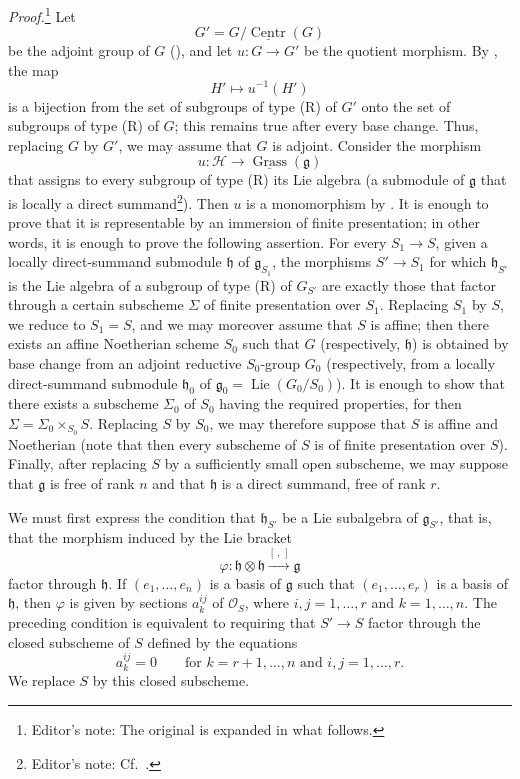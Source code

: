 \textit{Proof.}\footnote{Editor's note: The original is expanded in
what follows.}
Let
\[
  G'=G/\underline{\operatorname{Centr}}(G)
\]
be the adjoint group of \(G\) \textup{()}, and let
\(u\colon G\to G'\) be the quotient morphism. By ,
the map
\[
  H'\longmapsto u^{-1}(H')
\]
is a bijection from the set of subgroups of type \textup{(R)} of
\(G'\) onto the set of subgroups of type \textup{(R)} of \(G\);
this remains true after every base change. Thus, replacing \(G\)
by \(G'\), we may assume that \(G\) is adjoint. Consider the
morphism
\[
  u\colon
  \mathcal H
  \longrightarrow
  \underline{\operatorname{Grass}}(\mathfrak g)
\]
that assigns to every subgroup of type \textup{(R)} its Lie algebra
\textup{(a submodule of \(\mathfrak g\) that is locally a direct
summand\footnote{Editor's note: Cf.\ .})}.
Then \(u\) is a monomorphism by . It is enough to prove that
it is representable by an immersion of finite presentation; in
other words, it is enough to prove the following assertion. For
every \(S_1\to S\), given a locally direct-summand submodule
\(\mathfrak h\) of \(\mathfrak g_{S_1}\), the morphisms
\(S'\to S_1\) for which \(\mathfrak h_{S'}\) is the Lie algebra of
a subgroup of type \textup{(R)} of \(G_{S'}\) are exactly those
that factor through a certain subscheme \(\Sigma\) of finite
presentation over \(S_1\). Replacing \(S_1\) by \(S\), we reduce
to \(S_1=S\), and we may moreover assume that \(S\) is affine;
then there exists an affine Noetherian scheme \(S_0\) such that
\(G\) \textup{(respectively, \(\mathfrak h\))} is obtained by base
change from an adjoint reductive \(S_0\)-group \(G_0\)
\textup{(respectively, from a locally direct-summand submodule
\(\mathfrak h_0\) of
\(\mathfrak g_0=\operatorname{Lie}(G_0/S_0)\))}. It is enough to
show that there exists a subscheme \(\Sigma_0\) of \(S_0\) having
the required properties, for then
\(\Sigma=\Sigma_0\times_{S_0}S\). Replacing \(S\) by \(S_0\), we
may therefore suppose that \(S\) is affine and Noetherian
\textup{(note that then every subscheme of \(S\) is of finite
presentation over \(S\))}. Finally, after replacing \(S\) by a
sufficiently small open subscheme, we may suppose that
\(\mathfrak g\) is free of rank \(n\) and that \(\mathfrak h\) is
a direct summand, free of rank \(r\).

We must first express the condition that \(\mathfrak h_{S'}\) be
a Lie subalgebra of \(\mathfrak g_{S'}\), that is, that the
morphism induced by the Lie bracket
\[
  \varphi\colon
  \mathfrak h\otimes\mathfrak h
  \xrightarrow{[\, ,\,]}
  \mathfrak g
\]
factor through \(\mathfrak h\). If
\((e_1,\ldots,e_n)\) is a basis of \(\mathfrak g\) such that
\((e_1,\ldots,e_r)\) is a basis of \(\mathfrak h\), then
\(\varphi\) is given by sections \(a_k^{ij}\) of
\(\mathcal O_S\), where \(i,j=1,\ldots,r\) and
\(k=1,\ldots,n\). The preceding condition is equivalent to
requiring that \(S'\to S\) factor through the closed subscheme of
\(S\) defined by the equations
\[
  a_k^{ij}=0
  \qquad
  \text{for \(k=r+1,\ldots,n\) and \(i,j=1,\ldots,r\).}
\]
We replace \(S\) by this closed subscheme.


